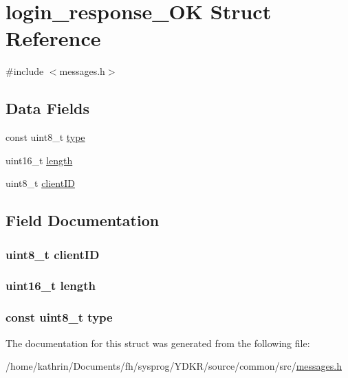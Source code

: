 \hypertarget{structlogin__response___o_k}{
\section{login\_\-response\_\-OK Struct Reference}
\label{structlogin__response___o_k}
}


{\ttfamily \#include $<$messages.h$>$}

\subsection*{Data Fields}
\begin{DoxyCompactItemize}
\item 
const uint8\_\-t \hyperlink{structlogin__response___o_k_aca7dafb0092715a03dd40f45fc607f2a}{type}
\item 
uint16\_\-t \hyperlink{structlogin__response___o_k_a1892eba2086d12ac2b09005aeb09ea3b}{length}
\item 
uint8\_\-t \hyperlink{structlogin__response___o_k_a31ecf44b85fc87e613c71f3c31a6e5c0}{clientID}
\end{DoxyCompactItemize}


\subsection{Field Documentation}
\hypertarget{structlogin__response___o_k_a31ecf44b85fc87e613c71f3c31a6e5c0}{
\subsubsection[{clientID}]{\setlength{\rightskip}{0pt plus 5cm}uint8\_\-t {\bf clientID}}}
\label{structlogin__response___o_k_a31ecf44b85fc87e613c71f3c31a6e5c0}
\hypertarget{structlogin__response___o_k_a1892eba2086d12ac2b09005aeb09ea3b}{
\subsubsection[{length}]{\setlength{\rightskip}{0pt plus 5cm}uint16\_\-t {\bf length}}}
\label{structlogin__response___o_k_a1892eba2086d12ac2b09005aeb09ea3b}
\hypertarget{structlogin__response___o_k_aca7dafb0092715a03dd40f45fc607f2a}{
\subsubsection[{type}]{\setlength{\rightskip}{0pt plus 5cm}const uint8\_\-t {\bf type}}}
\label{structlogin__response___o_k_aca7dafb0092715a03dd40f45fc607f2a}


The documentation for this struct was generated from the following file:\begin{DoxyCompactItemize}
\item 
/home/kathrin/Documents/fh/sysprog/YDKR/source/common/src/\hyperlink{messages_8h}{messages.h}\end{DoxyCompactItemize}

